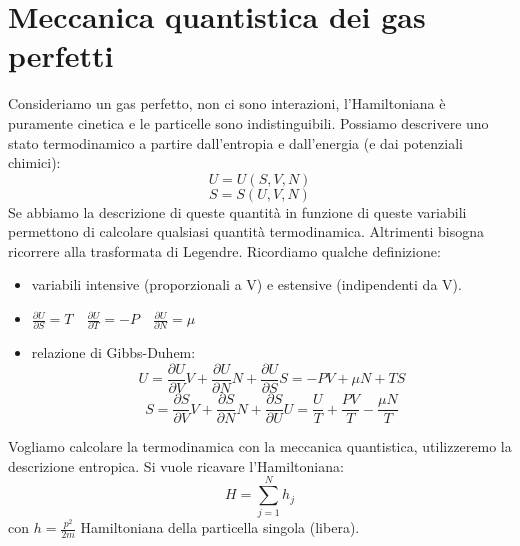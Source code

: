 \section{Meccanica quantistica dei gas perfetti} %
Consideriamo un gas perfetto, non ci sono interazioni, l'Hamiltoniana è puramente cinetica e le particelle sono indistinguibili.
Possiamo descrivere uno stato termodinamico a partire dall'entropia e dall'energia (e dai potenziali chimici):
\begin{equation}
U=U\left(S,V,N\right)
\end{equation}
\begin{equation}
S=S\left(U,V,N\right)
\end{equation}
Se abbiamo la descrizione di queste quantità in funzione di queste variabili permettono di calcolare qualsiasi quantità termodinamica. Altrimenti bisogna ricorrere alla trasformata di Legendre.
Ricordiamo qualche definizione:
\begin{itemize}
\item variabili intensive (proporzionali a V) e estensive (indipendenti da V).
\item $ \frac{\partial U}{\partial S}=T \quad \frac{\partial U}{\partial T}=-P \quad \frac{\partial U}{\partial N}=\mu$
\item relazione di Gibbs-Duhem: $$U=\frac{\partial U}{\partial V}V+\frac{\partial U}{\partial N}N+\frac{\partial U}{\partial S}S=-PV+\mu N+TS$$
					$$ S=\frac{\partial S}{\partial V}V+\frac{\partial S}{\partial N}N+\frac{\partial S}{\partial U}U=\frac{U}{T}+\frac{PV}{T}-\frac{\mu N}{T}$$
\end{itemize}
Vogliamo calcolare la termodinamica con la meccanica quantistica, utilizzeremo la descrizione entropica. 
Si vuole ricavare l'Hamiltoniana:
\begin{equation}
H=\sum_{j=1}^{N}{h_j}
\end{equation}
con $h=\frac{p^2}{2m}$ Hamiltoniana della particella singola (libera).

